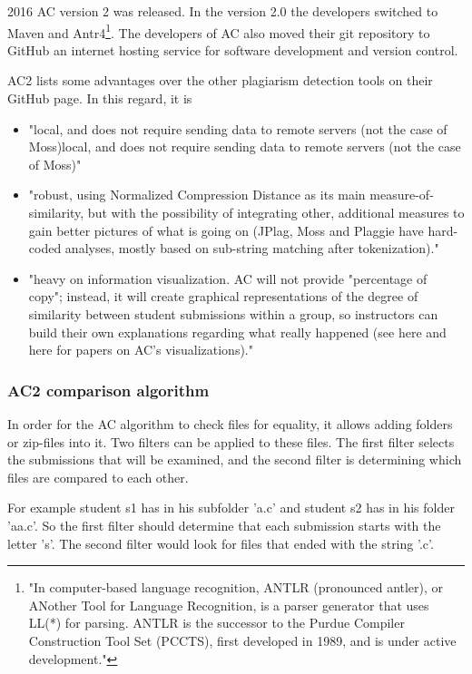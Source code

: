 \documentclass[a4paper, 11pt]{article}
\renewcommand{\\}{\vspace*{0.5\baselineskip} \newline}
\begin{document}
2016 AC version 2 was released. In the version 2.0 the developers switched to Maven and Antr4\footnote{\label{footnoteAntlr}"In computer-based language recognition, ANTLR (pronounced antler), or ANother Tool for Language Recognition, is a parser generator that uses LL(*) for parsing. ANTLR is the successor to the Purdue Compiler Construction Tool Set (PCCTS), first developed in 1989, and is under active development."\autocite{enwiki:1115716413}}. The developers of AC also moved their git repository to GitHub an internet hosting service for software development and version control.

AC2 lists some advantages over the other plagiarism detection tools on their GitHub page. In this regard, it is

\begin{itemize}
	\item "local, and does not require sending data to remote servers (not the case of Moss)local, and does not require sending data to remote servers (not the case of Moss)"
	\item "robust, using Normalized Compression Distance as its main measure-of-similarity, but with the possibility of integrating other, additional measures to gain better pictures of what is going on (JPlag, Moss and Plaggie have hard-coded analyses, mostly based on sub-string matching after tokenization)."
	\item "heavy on information visualization. AC will not provide "percentage of copy"; instead, it will create graphical representations of the degree of similarity between student submissions within a group, so instructors can build their own explanations regarding what really happened (see here and here for papers on AC's visualizations)."
\end{itemize}\autocite{AC2}

\subsubsection{AC2 comparison algorithm}
\label{sec:AC2ComparisonAlgorithm}

In order for the AC algorithm to check files for equality, it allows adding folders or zip-files into it. Two filters can be applied to these files. The first filter selects the submissions that will be examined, and the second filter is determining which files are compared to each other. 

For example student s1 has in his subfolder 'a.c' and student s2 has in his folder 'aa.c'. So the first filter should determine that each submission starts with the letter 's'. The second filter would look for files that ended with the string '.c'.
\end{document}
